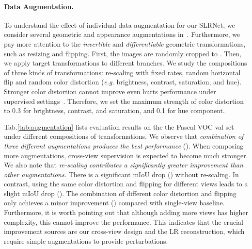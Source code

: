 \documentclass[twocolumn]{svjour3}          \smartqed  \usepackage{graphicx}
\makeatletter
\def\name{SLRNet}
\newcommand{\Tab}{Tab.\@\xspace}
\makeatother
\begin{document}
 
\paragraph{Data Augmentation.}
 To understand the effect of individual data augmentation for our {\name}, we consider several geometric and appearance augmentations in~\citep{ChenK0H20:SimCLR}.
 Furthermore, we pay more attention to the \textit{invertible} and \textit{differentiable} geometric transformations, such as resizing and flipping.
 First, the images are randomly cropped to . Then, we apply target transformations to different branches.
We study the compositions of three kinds of transformations: re-scaling with fixed rates, random horizontal flip and random color distortion (\textit{e.g.} brightness, contrast, saturation, and hue).
Stronger color distortion cannot improve even hurts performance under supervised settings~\citep{ChenK0H20:SimCLR,lee2021improving}.
Therefore, we set the maximum strength of color distortion to 0.3 for brightness, contrast, and saturation, and 0.1 for hue component.

\Tab\ref{tab:augmentation} lists evaluation results on the the Pascal VOC val set under different compositions of transformations.
We observe that \textit{combination of three different augmentations produces the best performance} ().
When composing more augmentations, cross-view supervision is expected to become much stronger.
We also note that \textit{re-scaling contributes a significantly greater improvement than other augmentations.}
There is a significant mIoU drop () without re-scaling.
In contrast, using the same color distortion and flipping for different views leads to a slight mIoU drop ().
The combination of different color distortion and flipping only achieves a minor improvement () compared with single-view baseline.
Furthermore, it is worth pointing out that although adding more views has higher complexity, this cannot improve the performance.
This indicates that the crucial improvement sources are our cross-view design and the LR reconstruction, which require simple augmentations to provide perturbations.
\end{document}
